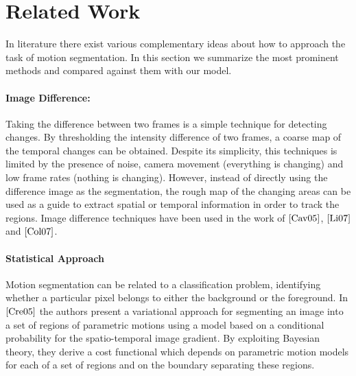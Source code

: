 \section{Related Work}
In literature there exist various complementary ideas about how to approach the task of motion segmentation. In this section we summarize the most prominent methods  and compared against them with our model.
%
%
%
%

\paragraph{Image Difference:} Taking the difference between two frames is a simple technique for detecting changes. By thresholding the intensity difference of two frames, a coarse map of the temporal changes can be obtained. Despite its simplicity, this techniques is limited by the presence of noise, camera movement (everything is changing) and low frame rates (nothing is changing). However, instead of directly using the difference image as the segmentation, the rough map of the changing areas can be used as a guide to extract spatial or temporal information in order to track the regions. Image difference techniques have been used in the work of $\cite{Cav05}$, $\cite{Li07}$ and $\cite{Col07}$.

\paragraph{Statistical Approach} Motion segmentation can be related to a classification problem, identifying whether a particular pixel belongs to either the background or the foreground. In $\cite{Cre05}$ the authors present a variational approach for segmenting an image into a set of regions of parametric motions using a model based on a conditional probability for the spatio-temporal image gradient. By exploiting Bayesian theory, they derive a cost functional which depends on parametric motion models for each  of a set of regions and on the boundary separating these regions.

